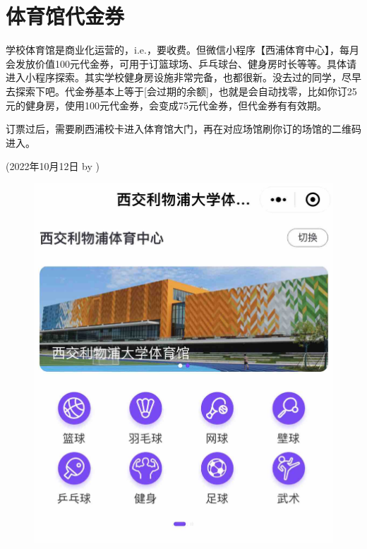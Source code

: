 \section{体育馆代金券}
\begin{newminipage}[0.5]
    学校体育馆是商业化运营的，i.e.，要收费。但微信小程序【西浦体育中心】，每月会发放价值100元代金券，可用于订篮球场、乒乓球台、健身房时长等等。具体请进入小程序探索。其实学校健身房设施非常完备，也都很新。没去过的同学，尽早去探索下吧。代金券基本上等于[会过期的余额]，也就是会自动找零，比如你订25元的健身房，使用100元代金券，会变成75元代金券，但代金券有有效期。

    订票过后，需要刷西浦校卡进入体育馆大门，再在对应场馆刷你订的场馆的二维码进入。

    \begin{flushright}
    (2022年10月12日 by \Wu)
    \end{flushright}
\end{newminipage}
\begin{newminipage}[0.45]
    \begin{figure}[H]
        \includegraphics[width=0.95\columnwidth, right]{author-folder/Kai.Wu/sportcenter_miniprogram.jpg}
    \end{figure}
\end{newminipage}


